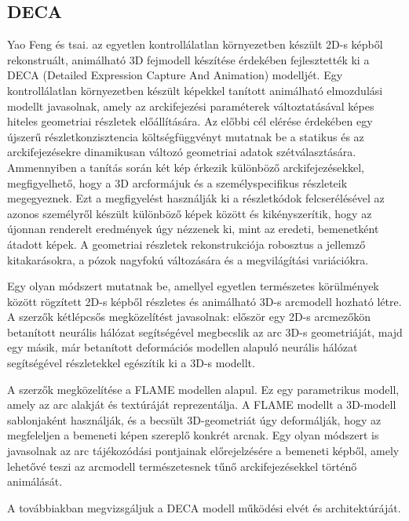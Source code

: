 \documentclass[12pt,a4]{article}
\begin{document}
        \subsection{DECA} \label{DECA}
 	
            \cite{deca}Yao Feng és tsai. az egyetlen kontrollálatlan környezetben készült 2D-s képből rekonstruált, animálható 3D fejmodell készítése érdekében fejlesztették ki a DECA (Detailed Expression Capture And Animation) modelljét. Egy kontrollálatlan környezetben készült képekkel tanított animálható elmozdulási modellt javasolnak, amely az arckifejezési paraméterek változtatásával képes hiteles geometriai részletek előállítására. Az előbbi cél elérése érdekében egy újszerű részletkonzisztencia költségfüggvényt mutatnak be a statikus és az arckifejezésekre dinamikusan változó geometriai adatok szétválasztására. Ammennyiben a tanítás során két kép érkezik különböző arckifejezésekkel, megfigyelhető, hogy a 3D arcformájuk és a személyspecifikus részleteik megegyeznek. Ezt a megfigyelést használják ki a részletkódok felcserélésével az azonos személyről készült különböző képek között és kikényszerítik, hogy az újonnan renderelt eredmények úgy nézzenek ki, mint az eredeti, bemenetként átadott képek. A geometriai részletek rekonstrukciója robosztus a jellemző kitakarásokra, a pózok nagyfokú változására és a megvilágítási variációkra.
    
            Egy olyan módszert mutatnak be, amellyel egyetlen természetes körülmények között rögzített 2D-s képből részletes és animálható 3D-s arcmodell hozható létre. A szerzők kétlépcsős megközelítést javasolnak: először egy 2D-s arcmezőkön betanított neurális hálózat segítségével megbecslik az arc 3D-s geometriáját, majd egy másik, már betanított deformációs modellen alapuló neurális hálózat segítségével részletekkel egészítik ki a 3D-s modellt.
    
            A szerzők megközelítése a FLAME modellen alapul. Ez egy parametrikus modell, amely az arc alakját és textúráját reprezentálja. A FLAME modellt a 3D-modell sablonjaként használják, és a becsült 3D-geometriát úgy deformálják, hogy az megfeleljen a bemeneti képen szereplő konkrét arcnak. Egy olyan módszert is javasolnak az arc tájékozódási pontjainak előrejelzésére a bemeneti képből, amely lehetővé teszi az arcmodell természetesnek tűnő arckifejezésekkel történő animálását.
    
        
     	      A továbbiakban megvizsgáljuk a DECA modell működési elvét és architektúráját.
\end{document}
